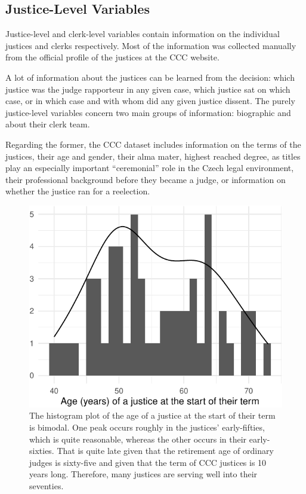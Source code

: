 \documentclass[
  11pt,
]{article}
\begin{document}
\hypertarget{justice-level-variables}{%
\subsection{Justice-Level Variables}\label{justice-level-variables}}

Justice-level and clerk-level variables contain information on the
individual justices and clerks respectively. Most of the information was
collected manually from the official profile of the justices at the CCC
website.

A lot of information about the justices can be learned from the
decision: which justice was the judge rapporteur in any given case,
which justice sat on which case, or in which case and with whom did any
given justice dissent. The purely justice-level variables concern two
main groups of information: biographic and about their clerk team.

Regarding the former, the CCC dataset includes information on the terms
of the justices, their age and gender, their alma mater, highest reached
degree, as titles play an especially important ``ceremonial'' role in
the Czech legal environment, their professional background before they
became a judge, or information on whether the justice ran for a
reelection.

\begin{figure}
\centering
\includegraphics{ANONYMIZED_The_Czech_Constitutional_Court_Dataset_files/figure-latex/age-1.pdf}
\caption{The histogram plot of the age of a justice at the start of
their term is bimodal. One peak occurs roughly in the justices'
early-fifties, which is quite reasonable, whereas the other occurs in
their early-sixties. That is quite late given that the retirement age of
ordinary judges is sixty-five and given that the term of CCC justices is
10 years long. Therefore, many justices are serving well into their
seventies.}
\end{figure}
\end{document}
